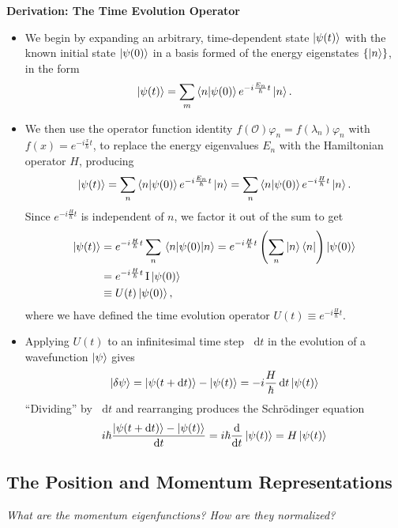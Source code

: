 \documentclass[11pt, a4paper]{article}
\newcommand{\diff}{\mathop{}\!\mathrm{d}} %
\newcommand{\Schro}{Schr\"{o}dinger\xspace}
\newcommand{\Ham}{Hamiltonian\xspace}
\renewcommand{\O}{\mathcal{O}}  %
\newcommand{\II}{\operatorname{I}}  %
\newcommand{\p}{\psi}  %
\begin{document}
\textbf{Derivation: The Time Evolution Operator}
\begin{itemize}
    \item We begin by expanding an arbitrary, time-dependent state $ \ket{\psi(t)} $ with the known initial state $ \ket{\psi(0)} $ in a basis formed of the energy eigenstates $ \{\ket{n}\} $, in the form
	\begin{equation*}
		\ket{\p(t)} = \sum_{m}\braket{n}{\p(0)}e^{-i\frac{E_{n}}{\hbar}t}\ket{n}.
	\end{equation*}
    
    \item We then use the operator function identity $ f(\O) \varphi_{n} = f(\lambda_{n} )\varphi_{n} $ with $ f(x) = e^{-i \frac{x}{\hbar} t} $, to replace the energy eigenvalues $ E_{n} $ with the \Ham operator $ H $, producing
	\begin{equation*}
		\ket{\p(t)} = \sum_{n}\braket{n}{\p(0)} e^{-i\frac{E_{n}}{\hbar}t}\ket{n} = \sum_{n} \braket{n}{\p(0)} e^{-i\frac{H}{\hbar}t}\ket{n}.
	\end{equation*}
	Since $ e^{-i\frac{H}{\hbar}t} $ is independent of $ n $, we factor it out of the sum to get
	\begin{align*}
        \ket{\p(t)} &= e^{-i\frac{H}{\hbar}t} \sum_{n} \mel{n}{\p(0)}{n} = e^{-i \frac{H}{\hbar}t} \left( \sum_{n} \ket{n}\bra{n} \right) \ket{\psi(0)} \\
        & = e^{-i \frac{H}{\hbar}t} \II \ket{\psi(0)}\\
        & \equiv U(t) \ket{\p(0)},
	\end{align*}
	where we have defined the time evolution operator $ U(t) \equiv e^{-i\frac{H}{\hbar}t} $. 
	
	\item Applying $ U(t) $ to an infinitesimal time step $ \diff t $ in the evolution of a wavefunction $ \ket{\p} $ gives
	\begin{equation*}
		\ket{\delta \p} = \ket{\psi(t + \diff t)} - \ket{\p(t)} = -i\frac{H}{\hbar}\diff t \ket{\p(t)}
	\end{equation*}
	``Dividing'' by $ \diff t $ and rearranging produces the \Schro equation
	\begin{equation*}
		i \hbar \frac{\ket{\psi(t + \diff t)} - \ket{\p(t)}}{\diff t} = i \hbar \dv{t}\ket{\psi(t)} = H \ket{\psi(t)}
	\end{equation*}
\end{itemize}

\subsection{The Position and Momentum Representations}
\textit{What are the momentum eigenfunctions? How are they normalized?}
\end{document}
